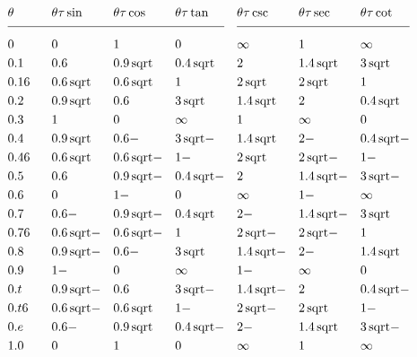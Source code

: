 \documentclass{amsart}
\begin{document}
\thispagestyle{empty}
\renewcommand\sqrt{\,\text{sqrt}}
\centering
$\begin{aligned}
&\theta \qquad 	&&\theta\tau\sin &&\theta\tau\cos &&\theta\tau\tan
\\[1ex] \hline \\[-1.5ex]
&0		&&0			&&1			&&0 \\
&0.1		&&0.6		&&0.9 \sqrt	&&0.4\sqrt \\
&0.16	&&0.6 \sqrt	&&0.6 \sqrt	&&1 \\
&0.2		&&0.9 \sqrt	&&0.6		&&3\sqrt \\
&0.3		&&1			&&0			&&\infty \\
&0.4		&&0.9 \sqrt	&&0.6-		&&3\sqrt- \\
&0.46	&&0.6 \sqrt	&&0.6 \sqrt-	&&1- \\
&0.5		&&0.6		&&0.9 \sqrt-	&&0.4\sqrt- \\
&0.6		&&0			&&1-			&&0 \\
&0.7		&&0.6-		&&0.9 \sqrt-	&&0.4\sqrt \\
&0.76	&&0.6 \sqrt-	&&0.6 \sqrt-	&&1 \\
&0.8		&&0.9 \sqrt-	&&0.6-		&&3\sqrt \\
&0.9		&&1- 		&&0			&&\infty \\
&0.t		&&0.9 \sqrt- 	&&0.6		&&3\sqrt- \\
&0.t6		&&0.6 \sqrt- 	&&0.6 \sqrt	&&1- \\
&0.e		&&0.6- 		&&0.9 \sqrt 	&&0.4\sqrt- \\
&1.0		&&0 			&&1			&&0
\end{aligned}
\quad
\begin{aligned}
&\theta\tau\csc &&\theta\tau\sec &&\theta\tau\cot
\\[1ex] \hline \\[-1.5ex]
&\infty		&&1			&&\infty \\
&2			&&1.4 \sqrt	&&3\sqrt \\
&2 \sqrt		&&2 \sqrt		&&1 \\
&1.4 \sqrt		&&2			&&0.4\sqrt \\
&1			&&\infty		&&0 \\
&1.4 \sqrt		&&2-			&&0.4\sqrt- \\
&2 \sqrt		&&2 \sqrt-		&&1- \\
&2			&&1.4 \sqrt-	&&3\sqrt- \\
&\infty		&&1-			&&\infty \\
&2-			&&1.4 \sqrt-	&&3\sqrt \\
&2 \sqrt- 		&&2 \sqrt-		&&1 \\
&1.4 \sqrt- 	&&2-			&&1.4\sqrt \\
&1- 			&&\infty		&&0 \\
&1.4 \sqrt- 	&&2			&&0.4\sqrt- \\
&2 \sqrt- 		&&2 \sqrt		&&1- \\
&2- 			&&1.4 \sqrt 	&&3\sqrt- \\
&\infty 		&&1			&&\infty
\end{aligned}$
\end{document}
